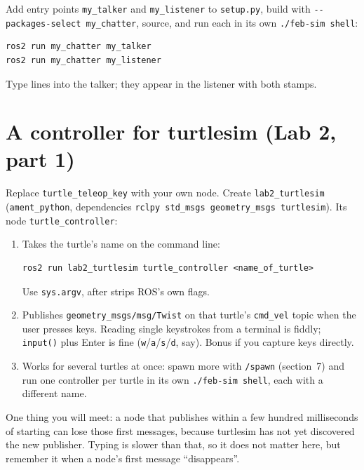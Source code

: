 \documentclass[11pt,a4paper]{article}
\begin{document}
Add entry points \texttt{my\_talker} and \texttt{my\_listener} to \texttt{setup.py}, build with
\texttt{-{}-packages-select my\_chatter}, source, and run each in its own \texttt{./feb-sim shell}:

\begin{lstlisting}
ros2 run my_chatter my_talker
ros2 run my_chatter my_listener
\end{lstlisting}

Type lines into the talker; they appear in the listener with both stamps.


\section{A controller for turtlesim (Lab 2, part 1)}
\label{sec:controller}

Replace \texttt{turtle\_teleop\_key} with your own node. Create \texttt{lab2\_turtlesim}
(\texttt{ament\_python}, dependencies \texttt{rclpy std\_msgs geometry\_msgs turtlesim}). Its
node \texttt{turtle\_controller}:

\begin{enumerate}
  \item Takes the turtle's name on the command line:
\begin{lstlisting}
ros2 run lab2_turtlesim turtle_controller <name_of_turtle>
\end{lstlisting}
  Use \texttt{sys.argv}, after  strips ROS's
  own flags.
  \item Publishes \texttt{geometry\_msgs/msg/Twist} on that turtle's \texttt{cmd\_vel} topic when
  the user presses keys. Reading single keystrokes from a terminal is fiddly; \texttt{input()}
  plus Enter is fine (\texttt{w}/\texttt{a}/\texttt{s}/\texttt{d}, say). Bonus if you capture
  keys directly.
  \item Works for several turtles at once: spawn more with \texttt{/spawn} (section~7) and run one
  controller per turtle in its own \texttt{./feb-sim shell}, each with a different name.
\end{enumerate}

One thing you will meet: a node that publishes within a few hundred milliseconds of starting
can lose those first messages, because turtlesim has not yet discovered the new publisher.
Typing is slower than that, so it does not matter here, but remember it when a node's first
message ``disappears''.
\end{document}
